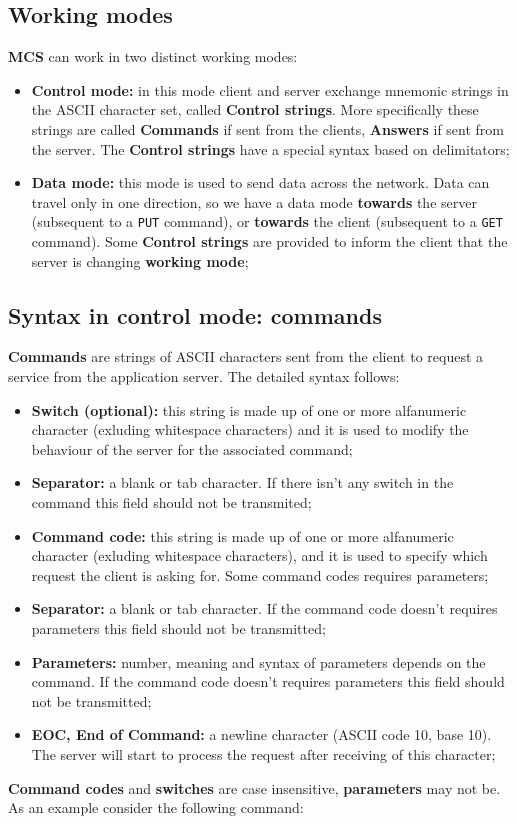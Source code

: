 \documentclass[12pt,titlepage]{book}
\newcommand{\mcs}{\textbf{MCS} }
\begin{document}
\subsection{Working modes}
\mcs can work in two distinct working modes:
\begin{itemize}
\item \textbf{Control mode:} in this mode client and server
  exchange mnemonic strings in the ASCII character set, called
  \textbf{Control strings}. More specifically these strings are called
  \textbf{Commands} if sent from the clients, \textbf{Answers} if sent
  from the server. The \textbf{Control strings} have a special syntax
  based on delimitators;

\item \textbf{Data mode:} this mode is used to send data across the
  network. Data can travel only in one direction, so we have a data
  mode \textbf{towards} the server (subsequent to a \verb|PUT|
  command), or \textbf{towards} the client (subsequent to a \verb|GET|
  command). Some \textbf{Control strings} are provided to inform the
  client that the server is changing \textbf{working mode};
\end{itemize}

\subsection{Syntax in control mode: commands}
\textbf{Commands} are strings of ASCII characters sent from the client
to request a service from the application server. The detailed syntax
follows:

\begin{itemize}
\item \textbf{Switch (optional):} this string is made up of one or
  more alfanumeric character (exluding whitespace characters) and it
  is used to modify the behaviour of the server for the associated
  command;
\item \textbf{Separator:} a blank or tab character. If there isn't any
  switch in the command this field should not be transmited;
\item \textbf{Command code:} this string is made up of one or more
  alfanumeric character (exluding whitespace characters), and it is
  used to specify which request the client is asking for. Some command
  codes requires parameters;
\item \textbf{Separator:} a blank or tab character. If the command
  code doesn't requires parameters this field should not be
  transmitted;
\item \textbf{Parameters:} number, meaning and
  syntax of parameters depends on the command. If the command code
  doesn't requires parameters this field should not be transmitted;
\item \textbf{EOC, End of Command:} a newline character (ASCII code 10, base
  10). The server will start to process the request after receiving of this
  character;
\end{itemize}
%
\textbf{Command codes} and \textbf{switches} are case insensitive,
\textbf{parameters} may not be. As an example consider the following command:
\end{document}
